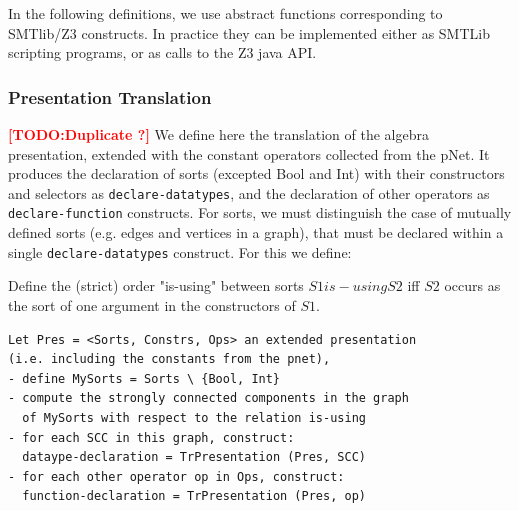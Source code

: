 \documentclass{lncs/llncs}
\newcommand{\TODO}[1]{\textcolor{red}{\textbf{[TODO:#1]}}}
\newcommand{\ERIC}[1]{\textcolor{blue}{#1}}
\begin{document}
\smallskip

In the following definitions, we use abstract functions corresponding to
SMTlib/Z3 constructs. In practice they can be implemented either as
SMTLib scripting programs, or as calls to the Z3 java API.

\subsubsection{Presentation Translation} \TODO{Duplicate ?}
We define here the translation of the algebra presentation, extended
with the constant operators collected from the pNet. It produces the
declaration of sorts (excepted Bool and Int) with their constructors
and selectors as \texttt{declare-datatypes}, and the declaration of
other operators as \texttt{declare-function} constructs.
For sorts, we must distinguish the case of mutually defined sorts
(e.g. edges and vertices in a graph), that must be declared within a
single \texttt{declare-datatypes} construct. For this we define:

\begin{definition}
Define the (strict) order "is-using" between sorts $S1 is-using S2$ iff $S2$
occurs as the sort of one argument in the constructors of $S1$.
\end{definition}


\begin{lstlisting}
Let Pres = <Sorts, Constrs, Ops> an extended presentation
(i.e. including the constants from the pnet),
- define MySorts = Sorts \ {Bool, Int}
- compute the strongly connected components in the graph
  of MySorts with respect to the relation is-using
- for each SCC in this graph, construct: 
  dataype-declaration = TrPresentation (Pres, SCC)
- for each other operator op in Ops, construct:
  function-declaration = TrPresentation (Pres, op)
\end{lstlisting}
\end{document}
